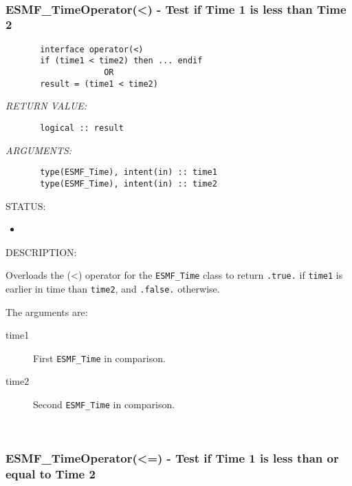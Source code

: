  
\mbox{}\hrulefill\ 
 
\subsubsection [ESMF\_TimeOperator(<)] {ESMF\_TimeOperator(<) - Test if Time 1 is less than Time 2}


  
\begin{verbatim}       interface operator(<)
       if (time1 < time2) then ... endif
                    OR
       result = (time1 < time2)\end{verbatim}{\em RETURN VALUE:}
\begin{verbatim}       logical :: result\end{verbatim}{\em ARGUMENTS:}
\begin{verbatim}       type(ESMF_Time), intent(in) :: time1
       type(ESMF_Time), intent(in) :: time2\end{verbatim}
{\sf STATUS:}
   \begin{itemize}
   \item{}
   \end{itemize}
  
{\sf DESCRIPTION:\\ }


       Overloads the (<) operator for the {\tt ESMF\_Time} class to return 
       {\tt .true.} if {\tt time1} is earlier in time than {\tt time2}, and 
       {\tt .false.} otherwise.
  
       The arguments are:
       \begin{description}
       \item[time1]
            First {\tt ESMF\_Time} in comparison.
       \item[time2]
            Second {\tt ESMF\_Time} in comparison.
       \end{description}
   
 
\mbox{}\hrulefill\ 
 
\subsubsection [ESMF\_TimeOperator(<=)] {ESMF\_TimeOperator(<=) - Test if Time 1 is less than or equal to Time 2}


